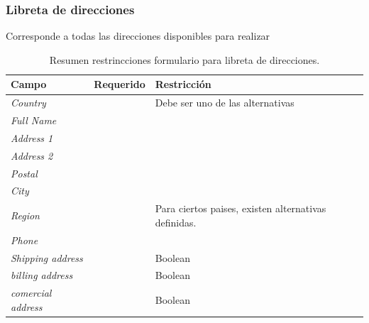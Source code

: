 \subsubsection{Libreta de direcciones}

Corresponde a todas las direcciones disponibles para realizar

\begin{table}[H]
    \centering
	\begin{tabular}{ |l|c||l| }
		\hline Campo & Requerido & Restricción \\ \hline
		\multirow{1}{*}{\textit{Country}} 			&  \checkmark 	&  Debe ser uno de las alternativas\\ \hline
		\multirow{1}{*}{\textit{Full Name}} 		&  \checkmark	& \\ \hline
		\multirow{1}{*}{\textit{Address 1}} 		&  \checkmark	& \\ \hline
		\multirow{1}{*}{\textit{Address 2}} 		&  				& \\ \hline
		\multirow{1}{*}{\textit{Postal}} 			&  \checkmark	& \\ \hline
		\multirow{1}{*}{\textit{City}} 				&  \checkmark	& \\ \hline
		\multirow{1}{*}{\textit{Region}} 			&  \checkmark	& Para ciertos paises, existen alternativas definidas.\\ \hline
		\multirow{1}{*}{\textit{Phone}} 			&  \checkmark	& \\ \hline
		\multirow{1}{*}{\textit{Shipping address}} 	&  \checkmark	& Boolean \\ \hline
		\multirow{1}{*}{\textit{billing address}} 	&  \checkmark	& Boolean \\ \hline
		\multirow{1}{*}{\textit{comercial address}} &  \checkmark	& Boolean \\ \hline
	\end{tabular}
 	\caption{Resumen restrincciones formulario para libreta de direcciones.}
    \label{tab:profile:form:restrictions:address}
\end{table}

